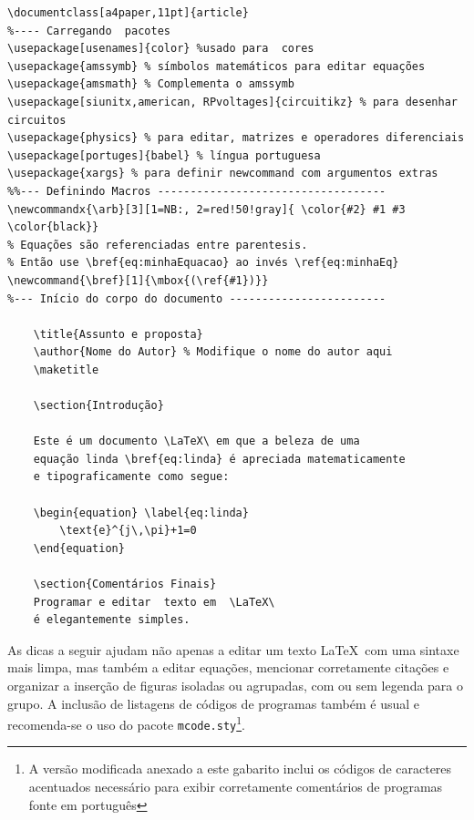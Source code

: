 \begin{lstlisting}[language={[Latex]Tex},frame=single,numbers =none, caption= {Estrutura básica de um documento \LaTeX.},label=lst:LatexBasicoDoc]
\documentclass[a4paper,11pt]{article}
%---- Carregando  pacotes
\usepackage[usenames]{color} %usado para  cores
\usepackage{amssymb} % símbolos matemáticos para editar equações
\usepackage{amsmath} % Complementa o amssymb
\usepackage[siunitx,american, RPvoltages]{circuitikz} % para desenhar circuitos 
\usepackage{physics} % para editar, matrizes e operadores diferenciais
\usepackage[portuges]{babel} % língua portuguesa
\usepackage{xargs} % para definir newcommand com argumentos extras
%%--- Definindo Macros -----------------------------------
\newcommandx{\arb}[3][1=NB:, 2=red!50!gray]{ \color{#2} #1 #3 \color{black}}
% Equações são referenciadas entre parentesis. 
% Então use \bref{eq:minhaEquacao} ao invés \ref{eq:minhaEq}
\newcommand{\bref}[1]{\mbox{(\ref{#1})}}
%--- Início do corpo do documento ------------------------

	\title{Assunto e proposta}
	\author{Nome do Autor} % Modifique o nome do autor aqui
	\maketitle
	
	\section{Introdução}
	
	Este é um documento \LaTeX\ em que a beleza de uma 
	equação linda \bref{eq:linda} é apreciada matematicamente 
	e tipograficamente como segue:
	
	\begin{equation} \label{eq:linda}
		\text{e}^{j\,\pi}+1=0
	\end{equation}
	
	\section{Comentários Finais}
	Programar e editar  texto em  \LaTeX\ 
	é elegantemente simples.

\end{lstlisting}

As dicas a seguir ajudam não apenas a editar um texto \LaTeX\ com uma sintaxe mais limpa, mas também a editar equações, mencionar corretamente citações e organizar a inserção de figuras isoladas ou agrupadas, com ou sem legenda para o grupo.  A inclusão de listagens de códigos de programas também é usual e recomenda-se o uso do pacote \texttt{mcode.sty}\footnote{A versão modificada anexado a este gabarito  inclui os códigos de caracteres acentuados necessário para exibir corretamente comentários de programas fonte  em português}. 

